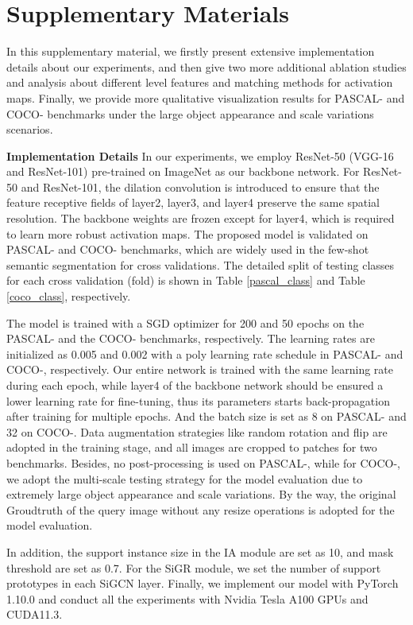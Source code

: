 \documentclass{bmvc2k}
\begin{document}
\newpage
\section{Supplementary Materials}
In this supplementary material, we firstly present extensive implementation details about our experiments, and then give two more additional ablation studies and analysis about different level features and matching methods for activation maps. Finally, we provide more qualitative visualization results for PASCAL- and COCO- benchmarks under the large object appearance and scale variations scenarios.

\textbf{Implementation Details}
In our experiments, we employ ResNet-50 (VGG-16 and ResNet-101) pre-trained on ImageNet as our backbone network.
For ResNet-50 and ResNet-101, the dilation convolution is introduced to ensure that the feature receptive fields of layer2, layer3, and layer4 preserve the same spatial resolution. 
The backbone weights are frozen except for layer4, which is required to learn more robust activation maps. The proposed model is validated on PASCAL- and COCO- benchmarks, which are widely used in the few-shot semantic segmentation for cross validations. The detailed split of testing classes for each cross validation (fold) is shown in Table \ref{pascal_class} and Table \ref{coco_class}, respectively.

The model is trained with a SGD optimizer for 200 and 50 epochs on the PASCAL- and the COCO- benchmarks, respectively.
The learning rates are initialized as 0.005 and 0.002 with a poly learning rate schedule in PASCAL- and COCO-, respectively. Our entire network is trained with the same learning rate during each epoch, while layer4 of the backbone network should be ensured a lower learning rate for fine-tuning, thus its parameters starts back-propagation after training for multiple epochs. And the batch size is set as 8 on PASCAL- and 32 on COCO-.
Data augmentation strategies like random rotation and flip are adopted in the training stage, and all images are cropped to  patches for two benchmarks. Besides, no post-processing is used on PASCAL-, while for COCO-, we adopt the multi-scale testing strategy for the model evaluation due to extremely large object appearance and scale variations. By the way, the original Groudtruth of the query image without any resize operations is adopted for the model evaluation.

In addition, the support instance size  in the IA module are set as 10, and mask threshold  are set as 0.7. For the SiGR module, we set the number of support prototypes  in each SiGCN layer. Finally, we implement our model with PyTorch 1.10.0 and conduct all the experiments with Nvidia Tesla A100 GPUs and CUDA11.3.
\end{document}
